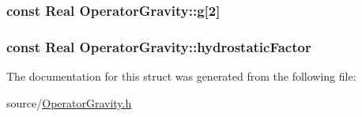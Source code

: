 \subsubsection[{g}]{\setlength{\rightskip}{0pt plus 5cm}const {\bf Real} Operator\+Gravity\+::g\mbox{[}2\mbox{]}}\label{struct_operator_gravity_aa63b78a733552761f6a5624cb57a6560}
\hypertarget{struct_operator_gravity_a0981f7c8369f7659c127c30743cb1827}{}
\subsubsection[{hydrostatic\+Factor}]{\setlength{\rightskip}{0pt plus 5cm}const {\bf Real} Operator\+Gravity\+::hydrostatic\+Factor}\label{struct_operator_gravity_a0981f7c8369f7659c127c30743cb1827}


The documentation for this struct was generated from the following file\+:\begin{DoxyCompactItemize}
\item 
source/\hyperlink{_operator_gravity_8h}{Operator\+Gravity.\+h}\end{DoxyCompactItemize}
